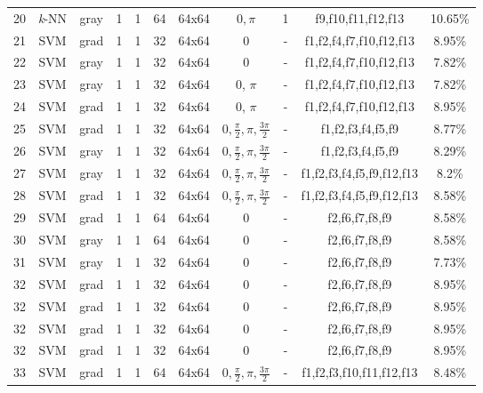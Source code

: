 \documentclass[times, utf8, zavrsni]{fer}
\begin{document}
\begin{adjustwidth}{-30pt}{0pt}
\begin{tabular}{c|c|c|c|c|c|c|c|c|c|c}
\end{tabular}
\end{adjustwidth}

\newpage

\begin{table}[ht]
\begin{adjustwidth}{-30pt}{0pt}
\begin{tabular}{c|c|c|c|c|c|c|c|c|c|c}
20 & \textit{k}-NN & gray & 1 & 1 & 64 & 64x64 & \(0, \pi\)& 1 & f9,f10,f11,f12,f13 & 10.65\% \\
21 & SVM & grad & 1 & 1 & 32 & 64x64 & 0 & - & f1,f2,f4,f7,f10,f12,f13 & 8.95\% \\
22 & SVM & gray & 1 & 1 & 32 & 64x64 & 0 & - & f1,f2,f4,f7,f10,f12,f13 & 7.82\% \\
23 & SVM & gray & 1 & 1 & 32 & 64x64 & 0, \(\pi\) & - & f1,f2,f4,f7,f10,f12,f13 & 7.82\% \\
24 & SVM & grad & 1 & 1 & 32 & 64x64 & 0, \(\pi\) & - & f1,f2,f4,f7,f10,f12,f13 & 8.95\% \\
25 & SVM & grad & 1 & 1 & 32 & 64x64 & \(0, \frac{\pi}{2}, \pi, \frac{3\pi}{2}\) & - & f1,f2,f3,f4,f5,f9 & 8.77\% \\
26 & SVM & gray & 1 & 1 & 32 & 64x64 & \(0, \frac{\pi}{2}, \pi, \frac{3\pi}{2}\) & - & f1,f2,f3,f4,f5,f9 & 8.29\% \\
27 & SVM & gray & 1 & 1 & 32 & 64x64 & \(0, \frac{\pi}{2}, \pi, \frac{3\pi}{2}\) & - & f1,f2,f3,f4,f5,f9,f12,f13 & 8.2\% \\
28 & SVM & grad & 1 & 1 & 32 & 64x64 & \(0, \frac{\pi}{2}, \pi, \frac{3\pi}{2}\) & - & f1,f2,f3,f4,f5,f9,f12,f13 & 8.58\% \\
29 & SVM & grad & 1 & 1 & 64 & 64x64 & 0 & - & f2,f6,f7,f8,f9 & 8.58\% \\
30 & SVM & gray & 1 & 1 & 64 & 64x64 & 0 & - & f2,f6,f7,f8,f9 & 8.58\% \\
31 & SVM & gray & 1 & 1 & 32 & 64x64 & 0 & - & f2,f6,f7,f8,f9 & 7.73\% \\
32 & SVM & grad & 1 & 1 & 32 & 64x64 & 0 & - & f2,f6,f7,f8,f9 & 8.95\% \\
32 & SVM & grad & 1 & 1 & 32 & 64x64 & 0 & - & f2,f6,f7,f8,f9 & 8.95\% \\
32 & SVM & grad & 1 & 1 & 32 & 64x64 & 0 & - & f2,f6,f7,f8,f9 & 8.95\% \\
32 & SVM & grad & 1 & 1 & 32 & 64x64 & 0 & - & f2,f6,f7,f8,f9 & 8.95\% \\
33 & SVM & grad & 1 & 1 & 64 & 64x64 & \(0, \frac{\pi}{2}, \pi, \frac{3\pi}{2}\) & - & f1,f2,f3,f10,f11,f12,f13 & 8.48\% \\

\end{tabular}
\end{adjustwidth}
\end{table}
\end{document}

